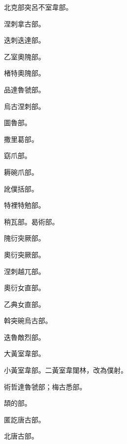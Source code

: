 \begin{pinyinscope}
 北克部突呂不室韋部。



 涅刺拿古部。



 迭刺迭達部。



 乙室奧隗部。



 楮特奧隗部。



 品達魯虢部。



 烏古涅刺部。



 圖魯部。



 撒里葛部。



 窈爪部。



 耨碗爪部。



 訛僕括部。



 特裡特勉部。



 稍瓦部。曷術部。



 隗衍突厥部。



 奧衍突厥部。



 涅刺越兀部。



 奧衍女直部。



 乙典女直部。



 斡突碗烏古部。



 迭魯敵烈部。



 大黃室韋部。



 小黃室韋部。二黃室韋闥林，改為僕射。



 術哲達魯虢部；梅古悉部。



 頡的部。



 匿訖唐古部。



 北唐古部。




\end{pinyinscope}
